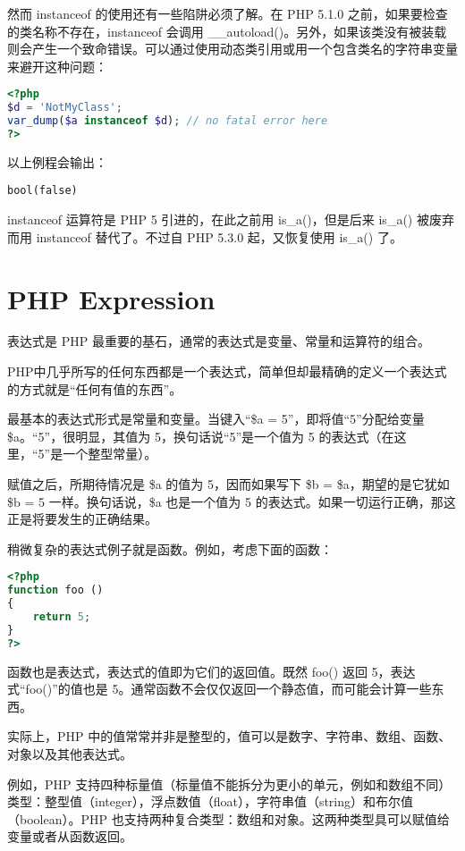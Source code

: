 然而 instanceof 的使用还有一些陷阱必须了解。在 PHP 5.1.0 之前，如果要检查的类名称不存在，instanceof 会调用 \_\_autoload()。另外，如果该类没有被装载则会产生一个致命错误。可以通过使用动态类引用或用一个包含类名的字符串变量来避开这种问题：

\begin{lstlisting}[language=PHP]
<?php
$d = 'NotMyClass';
var_dump($a instanceof $d); // no fatal error here
?>
\end{lstlisting}

以上例程会输出：

\begin{verbatim}
bool(false)
\end{verbatim}

instanceof 运算符是 PHP 5 引进的，在此之前用 is\_a()，但是后来 is\_a() 被废弃而用 instanceof 替代了。不过自 PHP 5.3.0 起，又恢复使用 is\_a() 了。




\chapter{PHP Expression}


表达式是 PHP 最重要的基石，通常的表达式是变量、常量和运算符的组合。

PHP中几乎所写的任何东西都是一个表达式，简单但却最精确的定义一个表达式的方式就是“任何有值的东西”。



最基本的表达式形式是常量和变量。当键入“\$a = 5”，即将值“5”分配给变量 \$a。“5”，很明显，其值为 5，换句话说“5”是一个值为 5 的表达式（在这里，“5”是一个整型常量）。

赋值之后，所期待情况是 \$a 的值为 5，因而如果写下 \$b = \$a，期望的是它犹如 \$b = 5 一样。换句话说，\$a 也是一个值为 5 的表达式。如果一切运行正确，那这正是将要发生的正确结果。

稍微复杂的表达式例子就是函数。例如，考虑下面的函数：

\begin{lstlisting}[language=PHP]
<?php
function foo ()
{
    return 5;
}
?>
\end{lstlisting}

函数也是表达式，表达式的值即为它们的返回值。既然 foo() 返回 5，表达式“foo()”的值也是 5。通常函数不会仅仅返回一个静态值，而可能会计算一些东西。

实际上，PHP 中的值常常并非是整型的，值可以是数字、字符串、数组、函数、对象以及其他表达式。

例如，PHP 支持四种标量值（标量值不能拆分为更小的单元，例如和数组不同）类型：整型值（integer），浮点数值（float），字符串值（string）和布尔值（boolean）。PHP 也支持两种复合类型：数组和对象。这两种类型具可以赋值给变量或者从函数返回。

